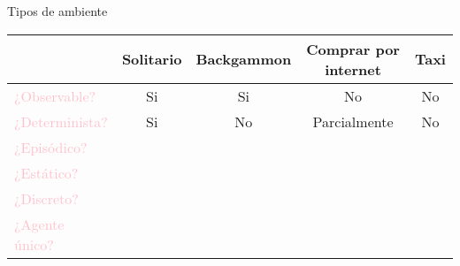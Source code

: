 
    \begin{frame}{Tipos de ambiente}
        \begin{center}
        \begin{tabular}{|l|c|c|c|c|} \hline
                \multicolumn{1}{|p{2cm}|}{\centering }
              & \multicolumn{1}{p{1.3cm}|}{\centering Solitario}
              & \multicolumn{1}{p{2.1cm}|}{\centering Backgammon}
              & \multicolumn{1}{p{3.4cm}|}{\centering Comprar por internet}
              & \multicolumn{1}{p{0.7cm}|}{\centering Taxi}
                \tabularnewline \hline
                \textcolor{Pink}{¿Observable?} & Si & Si & No & No \\
                \textcolor{Pink}{¿Determinista?} & Si & No & Parcialmente & No \\
                \textcolor{Pink}{¿Episódico?} &  &  &  &  \\
                \textcolor{Pink}{¿Estático?} &  &  &  &  \\
                \textcolor{Pink}{¿Discreto?} &  &  & &  \\
                \textcolor{Pink}{¿Agente único?} &  &  &  &  \\ \hline
        \end{tabular}
        \end{center}
    \end{frame}